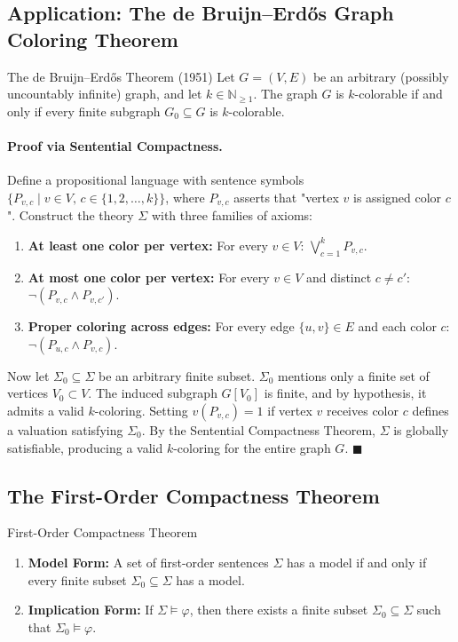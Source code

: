 \subsection{Application: The de Bruijn--Erd\H{o}s Graph Coloring Theorem}

\begin{theorembox}{The de Bruijn--Erd\H{o}s Theorem (1951)}
Let $G = (V, E)$ be an arbitrary (possibly uncountably infinite) graph, and let $k \in \mathbb{N}_{\ge 1}$.
The graph $G$ is $k$-colorable if and only if every finite subgraph $G_0 \subseteq G$ is $k$-colorable.
\end{theorembox}

\paragraph{Proof via Sentential Compactness.}
Define a propositional language with sentence symbols $\{ P_{v, c} \mid v \in V,\, c \in \{1, 2, \dots, k\} \}$, where $P_{v, c}$ asserts that "vertex $v$ is assigned color $c$".
Construct the theory $\Sigma$ with three families of axioms:
\begin{enumerate}[leftmargin=1.4em,itemsep=2pt]
  \item \textbf{At least one color per vertex:} For every $v \in V$: $\bigvee_{c=1}^k P_{v, c}$.
  \item \textbf{At most one color per vertex:} For every $v \in V$ and distinct $c \neq c'$: $\neg(P_{v, c} \land P_{v, c'})$.
  \item \textbf{Proper coloring across edges:} For every edge $\{u, v\} \in E$ and each color $c$: $\neg(P_{u, c} \land P_{v, c})$.
\end{enumerate}
Now let $\Sigma_0 \subseteq \Sigma$ be an arbitrary finite subset. $\Sigma_0$ mentions only a finite set of vertices $V_0 \subset V$.
The induced subgraph $G[V_0]$ is finite, and by hypothesis, it admits a valid $k$-coloring. Setting $v(P_{v, c}) = 1$ if vertex $v$ receives color $c$ defines a valuation satisfying $\Sigma_0$.
By the Sentential Compactness Theorem, $\Sigma$ is globally satisfiable, producing a valid $k$-coloring for the entire graph $G$. $\blacksquare$

\subsection{The First-Order Compactness Theorem}

\begin{theorembox}{First-Order Compactness Theorem}
\begin{enumerate}[leftmargin=1.4em,itemsep=3pt]
  \item \textbf{Model Form:} A set of first-order sentences $\Sigma$ has a model if and only if every finite subset $\Sigma_0 \subseteq \Sigma$ has a model.
  \item \textbf{Implication Form:} If $\Sigma \models \varphi$, then there exists a finite subset $\Sigma_0 \subseteq \Sigma$ such that $\Sigma_0 \models \varphi$.
\end{enumerate}
\end{theorembox}

